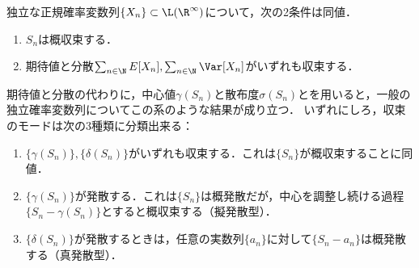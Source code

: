 \documentclass[uplatex,dvipdfmx]{jsreport}
\begin{document}
\begin{corollary}
    独立な正規確率変数列$\{X_n\}\subset\L(\R^\infty)$について，次の2条件は同値．
    \begin{enumerate}
        \item $S_n$は概収束する．
        \item 期待値と分散$\sum_{n\in\N}E[X_n],\sum_{n\in\N}\Var[X_n]$がいずれも収束する．
    \end{enumerate}
\end{corollary}
\begin{remarks}
    期待値と分散の代わりに，中心値$\gamma(S_n)$と散布度$\sigma(S_n)$とを用いると，一般の独立確率変数列についてこの系のような結果が成り立つ．
    いずれにしろ，収束のモードは次の3種類に分類出来る：
    \begin{enumerate}
        \item $\{\gamma(S_n)\},\{\delta(S_n)\}$がいずれも収束する．これは$\{S_n\}$が概収束することに同値．
        \item $\{\gamma(S_n)\}$が発散する．これは$\{S_n\}$は概発散だが，中心を調整し続ける過程$\{S_n-\gamma(S_n)\}$とすると概収束する（擬発散型）．
        \item $\{\delta(S_n)\}$が発散するときは，任意の実数列$\{a_n\}$に対して$\{S_n-a_n\}$は概発散する（真発散型）．
    \end{enumerate}
\end{remarks}
\end{document}
